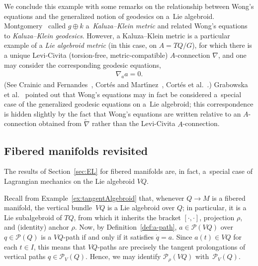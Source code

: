 \documentclass[pdftex]{sigma}
\numberwithin{equation}{section}
\begin{document}
\begin{Example}
 We conclude this example with some remarks on the relationship between Wong's equations and the generalized notion of geodesics on a~Lie algebroid. Montgomery~\cite{Montgomery1990} called $ g \oplus k $ a~\emph{Kaluza--Klein metric} and related Wong's equations to \emph{Kaluza--Klein geodesics}. However, a Kaluza--Klein metric is a particular example of a \emph{Lie algebroid metric} (in this case, on $ A = T Q / G $), for which there is a unique Levi-Civita
 (torsion-free, metric-compatible) $A$-connection $ \nabla $, and one may consider the corresponding geodesic equations,
 \begin{gather*}
 \nabla _a a = 0 .
 \end{gather*}
(See Crainic and Fernandes~\cite{CrFe2003}, Cort\'es and Mart\'{\i}nez~\cite{CoMa2004}, Cort\'es et al.~\cite{CoLeMaMaMa2006}.) Grabowska et al.~\cite{GrUrGr2006} pointed out that Wong's equations may in fact be considered a~special case of the generalized geodesic equations on a~Lie algebroid; this correspondence is hidden slightly by the fact that Wong's equations are written relative to an $A$-connection obtained from $ \widetilde{ \nabla } $ rather than the Levi-Civita $A$-connection.
\end{Example}

\subsection{Fibered manifolds revisited}

The results of Section~\ref{sec:EL} for f\/ibered manifolds are, in fact, a~special case of Lagrangian mechanics on the Lie algebroid $ V Q $.

Recall from Example~\ref{ex:tangentAlgebroid} that, whenever $ Q \rightarrow M $ is a f\/ibered manifold, the vertical bundle~$ V Q $ is a Lie algebroid over $Q$; in particular, it is a Lie subalgebroid of $ T Q $, from which it inherits the bracket $ [ \cdot , \cdot ] $, projection $ \rho $, and (identity) anchor $ \rho $. Now, by Def\/inition~\ref{def:a-path}, $ a \in \mathcal{P} ( V Q ) $ over $ q \in \mathcal{P} (Q) $ is a $ V Q $-path if and only if it
satisf\/ies $ \dot{q} = a $. Since $ a (t) \in V Q $ for each $ t \in I $, this means that $ V Q $-paths are precisely the tangent prolongations of vertical paths $ q \in \mathcal{P} _V (Q) $. Hence, we may identify $ \mathcal{P} _\rho ( V Q ) $ with~$ \mathcal{P} _V (Q) $.
\end{document}
